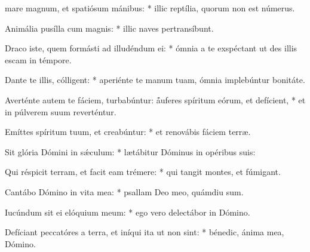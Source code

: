 \begin{psalmus}

 mare magnum, et spatiósum mánibus: * illic reptília, quorum non est númerus.

Animália pusílla cum magnis: * illic naves pertransíbunt.

Draco iste, quem formásti ad illudéndum ei: * ómnia a te exspéctant ut des illis escam in témpore.

Dante te illis, cólligent: * aperiénte te manum tuam, ómnia implebúntur bonitáte.

Averténte autem te fáciem, turbabúntur: \f áuferes spíritum eórum, et defícient, * et in púlverem suum reverténtur.

Emíttes spíritum tuum, et creabúntur: * et renovábis fáciem terræ.

Sit glória Dómini in sǽculum: * lætábitur Dóminus in opéribus suis:

Qui réspicit terram, et facit eam trémere: * qui tangit montes, et fúmigant.

Cantábo Dómino in vita mea: * psallam Deo meo, quámdiu sum.

Iucúndum sit ei elóquium meum: * ego vero delectábor in Dómino.

Defíciant peccatóres a terra, et iníqui ita ut non sint: * bénedic, ánima mea, Dómino.

\end{psalmus}
